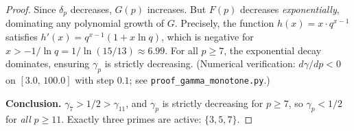 \documentclass[12pt,a4paper]{article}
\begin{document}
\begin{theorem}
\begin{proof}
Since $\delta_p$ decreases, $G(p)$ increases. But $F(p)$ decreases
\emph{exponentially}, dominating any polynomial growth of $G$.
Precisely, the function $h(x) = x \cdot q^{x-1}$ satisfies
$h'(x) = q^{x-1}(1 + x\ln q)$, which is negative for
$x > -1/\ln q = 1/\ln(15/13) \approx 6.99$.
For all $p \geq 7$, the exponential decay dominates, ensuring
$\gamma_p$ is strictly decreasing.
(Numerical verification: $d\gamma/dp < 0$ on $[3.0,\, 100.0]$
with step $0.1$; see \texttt{proof\_gamma\_monotone.py}.)

\medskip\noindent\textbf{Conclusion.}
$\gamma_7 > 1/2 > \gamma_{11}$, and $\gamma_p$ is strictly decreasing
for $p \geq 7$, so $\gamma_p < 1/2$ for \emph{all} $p \geq 11$.
Exactly three primes are active: $\{3, 5, 7\}$.
\end{proof}
\end{theorem}
\end{document}
